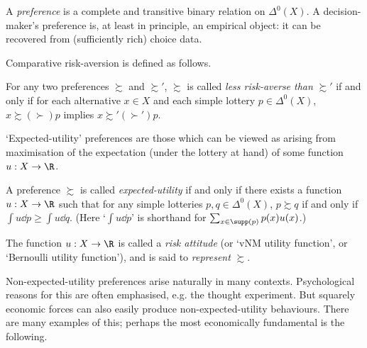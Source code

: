 A \emph{preference} is a complete and transitive binary relation on $\Delta^0(X)$. A decision-maker's preference is, at least in principle, an empirical object: it can be recovered from (sufficiently rich) choice data.

Comparative risk-aversion is defined as follows.

\begin{definition}
	\label{definition:lra}
	For any two preferences $\succsim$ and $\succsim'$, $\succsim$ is called \emph{less risk-averse than} $\succsim'$ if and only if for each alternative $x \in X$ and each simple lottery $p \in \Delta^0(X)$, $x \succsim \mathrel{(\succ)} p$ implies $x \succsim' \mathrel{(\succ')} p$.
\end{definition}

`Expected-utility' preferences are those which can be viewed as arising from maximisation of the expectation (under the lottery at hand) of some function $u : X \to \R$.

\begin{definition}
	\label{definition:eu}
	A preference $\succsim$ is called \emph{expected-utility} if and only if there exists a function $u : X \to \R$ such that for any simple lotteries $p,q \in \Delta^0(X)$, $p \succsim q$ if and only if $\int u \dd p \geq \int u \dd q$. (Here `$\int u \dd p$' is shorthand for $\sum_{x \in \supp(p)} p(x) u(x)$.)
\end{definition}

The function $u : X \to \R$ is called a \emph{risk attitude} (or `vNM utility function', or `Bernoulli utility function'), and is said to \emph{represent} $\succsim$.

Non-expected-utility preferences arise naturally in many contexts. Psychological reasons for this are often emphasised, e.g. the \textcite{Allais1953} thought experiment. But squarely economic forces can also easily produce non-expected-utility behaviours. There are many examples of this; perhaps the most economically fundamental is the following.

